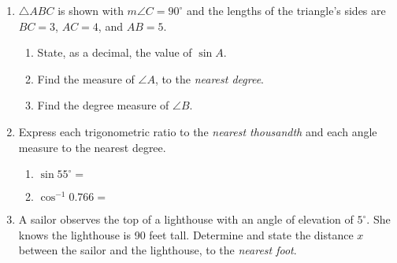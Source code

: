 \documentclass[12pt, twoside]{article}
\begin{document}
\begin{enumerate}
  \item $\triangle ABC$ is shown with $m\angle C=90^\circ$ and the lengths of the triangle's sides are $BC=3$, $AC=4$, and $AB=5$.
  \begin{multicols}{2}
        \begin{enumerate}
        \item State, as a decimal, the value of $\sin A$. \vspace{1.25cm}
        \item Find the measure of $\angle A$, to the \emph{nearest degree}. \vspace{1.25cm}
        \item Find the degree measure of $\angle B$.
      \end{enumerate}
    \end{multicols}
    \vspace{1.5cm}

  \item Express each trigonometric ratio to the \emph{nearest thousandth} and each angle measure to the nearest degree.
    \begin{multicols}{2}
      \begin{enumerate}
        \item $\sin 55^\circ =$ \vspace{0.5cm}
        \item $\cos^{-1} 0.766 =$ \vspace{0.5cm}
      \end{enumerate}
    \end{multicols} \vspace{0.25cm}

  \item A sailor observes the top of a lighthouse with an angle of elevation of $5^\circ$. She knows the lighthouse is 90 feet tall. Determine and state the distance $x$ between the sailor and the lighthouse, to the \emph{nearest foot}.\\[0.5cm]
     \vspace{3.25cm}


\end{enumerate}
\end{document}
